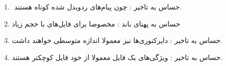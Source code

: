 \begin{boxK}
    \begin{enumerate}
        \item 
‍‍‍             حساس به تاخیر : 
        چون پیام‌های ردوبدل شده کوتاه هستند.
        \item 
         حساس به پهنای باند :
         مخصوصا برای فایل‌های با حجم زیاد
         
        \item
        حساس به تاخیر : 
        دایرکتوری‌ها نیز معمولا اندازه متوسطی خواهند داشت.
        \item 
        حساس به تاخیر :
      ویژگی‌های یک فایل معمولا از خود فایل کوچکتر هستند.
    \end{enumerate}
\end{boxK}